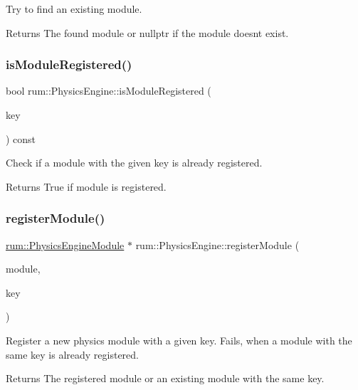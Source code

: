 Try to find an existing module. \begin{DoxyReturn}{Returns}
The found module or nullptr if the module doesn\textquotesingle{}t exist. 
\end{DoxyReturn}
\mbox{\label{classrum_1_1_physics_engine_a55c3e6247c7ccfdda4c2c2a6c30b5288}} 
\subsubsection{\texorpdfstring{is\+Module\+Registered()}{isModuleRegistered()}}
{\footnotesize\ttfamily bool rum\+::\+Physics\+Engine\+::is\+Module\+Registered (\begin{DoxyParamCaption}\item[{const std\+::string \&}]{key }\end{DoxyParamCaption}) const}

Check if a module with the given key is already registered. \begin{DoxyReturn}{Returns}
True if module is registered. 
\end{DoxyReturn}
\mbox{\label{classrum_1_1_physics_engine_a00dea33ce045830e254e3c4c236593ed}} 
\subsubsection{\texorpdfstring{register\+Module()}{registerModule()}}
{\footnotesize\ttfamily \mbox{\hyperlink{classrum_1_1_physics_engine_module}{rum\+::\+Physics\+Engine\+Module}} $\ast$ rum\+::\+Physics\+Engine\+::register\+Module (\begin{DoxyParamCaption}\item[{\mbox{\hyperlink{classrum_1_1_physics_engine_module}{Physics\+Engine\+Module}} $\ast$}]{module,  }\item[{const std\+::string \&}]{key }\end{DoxyParamCaption})}

Register a new physics module with a given key. Fails, when a module with the same key is already registered. \begin{DoxyReturn}{Returns}
The registered module or an existing module with the same key. 
\end{DoxyReturn}
\mbox{\label{classrum_1_1_physics_engine_a9e91e1e4d63b67c134f39eff6750b728}} 
